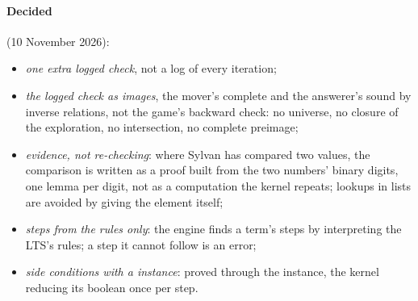 \paragraph{Decided} (10 November 2026):
\begin{itemize}
\item \emph{one extra logged check}, not a log of every iteration;
\item \emph{the logged check as images}, the mover's complete and the
  answerer's sound by inverse relations, not the game's backward check:
  no universe, no closure of the exploration, no intersection, no
  complete preimage;
\item \emph{evidence, not re-checking}: where Sylvan has compared two
  values, the comparison is written as a proof built from the two
  numbers' binary digits, one lemma per digit, not as a computation the
  kernel repeats; lookups in lists are avoided by giving the element
  itself;
\item \emph{steps from the rules only}: the engine finds a term's steps by
  interpreting the LTS's rules; a step it cannot follow is an error;
\item \emph{side conditions with a  instance}: proved
  through the instance, the kernel reducing its boolean once per step.
\end{itemize}
